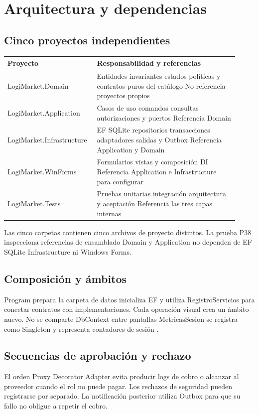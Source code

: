 
\section{Arquitectura y dependencias}
\subsection{Cinco proyectos independientes}
\begingroup\small
\noindent
\begin{tabular}{@{}>{\raggedright\arraybackslash}p{0.33\linewidth}>{\raggedright\arraybackslash}p{0.59\linewidth}@{}}
\toprule
\textbf{Proyecto} & \textbf{Responsabilidad y referencias}\\
\midrule
LogiMarket.Domain & Entidades invariantes estados políticas y contratos puros del catálogo No referencia proyectos propios\\[3pt]
LogiMarket.Application & Casos de uso comandos consultas autorizaciones y puertos Referencia Domain\\[3pt]
LogiMarket.Infrastructure & EF SQLite repositorios transacciones adaptadores salidas y Outbox Referencia Application y Domain\\[3pt]
LogiMarket.WinForms & Formularios vistas y composición DI Referencia Application e Infrastructure para configurar\\[3pt]
LogiMarket.Tests & Pruebas unitarias integración arquitectura y aceptación Referencia las tres capas internas\\[3pt]
\bottomrule
\end{tabular}
\par\endgroup

Las cinco carpetas contienen cinco archivos de proyecto distintos. La prueba P38 inspecciona referencias de ensamblado Domain y Application no dependen de EF SQLite Infrastructure ni Windows Forms.
\FloatBarrier
\subsection{Composición y ámbitos}
Program prepara la carpeta de datos inicializa EF y utiliza RegistroServicios para conectar contratos con implementaciones. Cada operación visual crea un ámbito nuevo. No se comparte DbContext entre pantallas MetricasSesion se registra como Singleton y representa contadores de sesión \cite{di}.

\subsection{Secuencias de aprobación y rechazo}
\FloatBarrier
El orden Proxy Decorator Adapter evita producir logs de cobro o alcanzar al proveedor cuando el rol no puede pagar. Los rechazos de seguridad pueden registrarse por separado. La notificación posterior utiliza Outbox para que su fallo no obligue a repetir el cobro.
